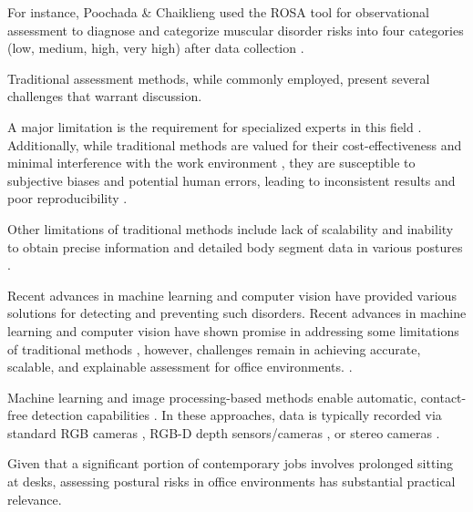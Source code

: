 \documentclass[lettersize,journal]{IEEEtran}
\begin{document}
For instance, Poochada \& Chaiklieng used the ROSA tool for observational assessment to diagnose and categorize muscular disorder risks into four categories (low, medium, high, very high) after data collection \cite{poochada2015ergonomic}.

Traditional assessment methods, while commonly employed, present several challenges that warrant discussion.

A major limitation is the requirement for specialized experts in this field \cite{paudel2022industrial}. Additionally, while traditional methods are valued for their cost-effectiveness and minimal interference with the work environment \cite{yang2024systematic}, they are susceptible to subjective biases and potential human errors, leading to inconsistent results and poor reproducibility \cite{paudel2022industrial}.

Other limitations of traditional methods include lack of scalability and inability to obtain precise information and detailed body segment data in various postures \cite{yang2024systematic}.

Recent advances in machine learning and computer vision have provided various solutions for detecting and preventing such disorders. Recent advances in machine learning and computer vision have shown promise in addressing some limitations of traditional methods \cite{ANSIHFES1002007}, however, challenges remain in achieving accurate, scalable, and explainable assessment for office environments. \cite{paudel2022industrial}.

Machine learning and image processing-based methods enable automatic, contact-free detection capabilities \cite{yang2024systematic}. In these approaches, data is typically recorded via standard RGB cameras \cite{menanno2024ergonomic}, RGB-D depth sensors/cameras \cite{hossain2023ergonomic}, or stereo cameras \cite{massirisfernandez2020ergonomic}.

Given that a significant portion of contemporary jobs involves prolonged sitting at desks, assessing postural risks in office environments has substantial practical relevance.

\end{document}
